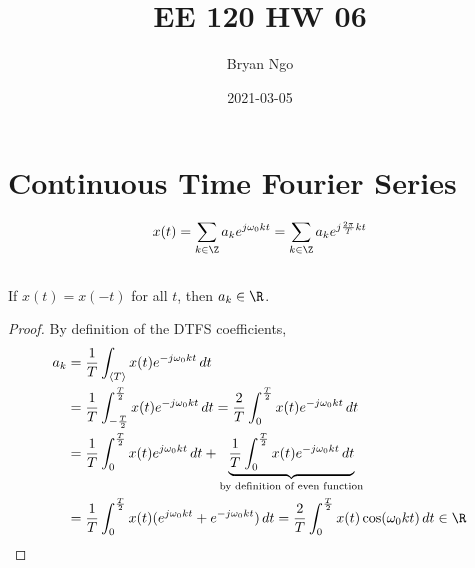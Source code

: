 \documentclass{article}
\title{EE 120 HW 06}
\author{Bryan Ngo}
\date{2021-03-05}
\begin{document}
\maketitle

\section{Continuous Time Fourier Series}

\begin{equation}
    x(t) = \sum_{k \in \Z} a_k e^{j \omega_0 k t} = \sum_{k \in \Z} a_k e^{j \frac{2\pi}{T} kt}
\end{equation}

\subsection{}

\begin{theorem}
    If \(x(t) = x(-t)\) for all \(t\), then \(a_k \in \R\).
\end{theorem}
\begin{proof}
    By definition of the DTFS coefficients,
    \begin{align}
        a_k &= \frac{1}{T} \int_{\langle T \rangle} x(t) e^{-j \omega_0 k t} \, dt \\
        &= \frac{1}{T} \int_{-\frac{T}{2}}^{\frac{T}{2}} x(t) e^{-j \omega_0 k t} \, dt = \frac{2}{T} \int_0^{\frac{T}{2}} x(t) e^{-j \omega_0 k t} \, dt \\
        &= \frac{1}{T} \int_0^{\frac{T}{2}} x(t) e^{j \omega_0 k t} \, dt + \underbrace{\frac{1}{T} \int_0^{\frac{T}{2}} x(t) e^{-j \omega_0 k t} \, dt}_{\text{by definition of even function}} \\
        &= \frac{1}{T} \int_0^{\frac{T}{2}} x(t) (e^{j \omega_0 k t} + e^{-j \omega_0 k t}) \, dt = \frac{2}{T} \int_0^{\frac{T}{2}} x(t) \cos(\omega_0 k t) \, dt \in \R
    \end{align}
\end{proof}

\subsection{}
\end{document}
